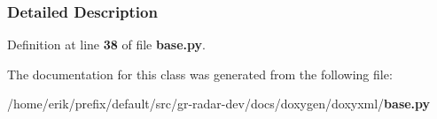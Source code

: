\subsubsection{Detailed Description}


Definition at line {\bf 38} of file {\bf base.\+py}.



The documentation for this class was generated from the following file\+:\begin{DoxyCompactItemize}
\item 
/home/erik/prefix/default/src/gr-\/radar-\/dev/docs/doxygen/doxyxml/{\bf base.\+py}\end{DoxyCompactItemize}
